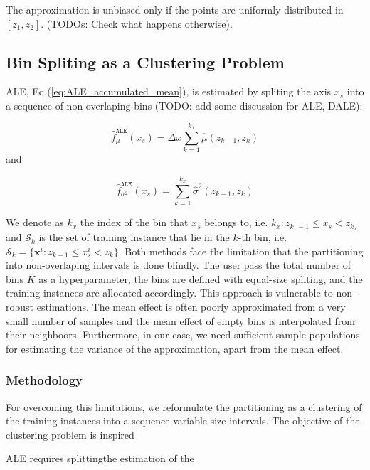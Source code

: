 \documentclass[twoside]{article}
\newcommand{\xb}{\mathbf{x}}
\begin{document}
The approximation is unbiased only if the points are uniformly
distributed in \([z_1, z_2]\). (TODOs: Check what happens
otherwise).

\subsection{Bin Spliting as a Clustering Problem}

ALE, Eq.(\ref{eq:ALE_accumulated_mean}), is estimated by spliting the
axis \(x_s\) into a sequence of non-overlaping bins (TODO: add some
discussion for ALE, DALE):

\begin{equation}
  \label{eq:ALE_accumulated_mean_est}
  \hat{f}^{\mathtt{ALE}}_{\mu}(x_s) = \Delta x \sum_{k=1}^{k_x} \hat{\mu}(z_{k-1}, z_k)
\end{equation}
and 

\begin{equation}
  \label{eq:ALE_accumulated_var_est}
  \hat{f}^{\mathtt{ALE}}_{\sigma^2}(x_s) = \sum_{k=1}^{k_x} \hat{\sigma}^2(z_{k-1}, z_k)
\end{equation}

We denote as \(k_x\) the index of the bin that \(x_s\) belongs to,
i.e. \(k_x: z_{k_x-1} \leq x_s < z_{k_x} \) and \(\mathcal{S}_k\) is
the set of training instance that lie in the \(k\)-th bin, i.e.
\( \mathcal{S}_k = \{ \xb^i : z_{k-1} \leq x^i_s < z_{k} \} \). Both
methods face the limitation that the partitioning into non-overlaping
intervals is done blindly. The user pass the total number of bins
\(K\) as a hyperparameter, the bins are defined with equal-size
spliting, and the training instances are allocated accordingly. This
approach is vulnerable to non-robust estimations. The mean effect is
often poorly approximated from a very small number of samples and the
mean effect of empty bins is interpolated from their
neighboors. Furthermore, in our case, we need sufficient sample
populations for estimating the variance of the approximation, apart
from the mean effect.

\subsubsection{Methodology}

For overcoming this limitations, we reformulate the partitioning as a
clustering of the training instances into a sequence variable-size
intervals. The objective of the clustering problem is inspired 


ALE requires splittingthe estimation of the 
\end{document}

